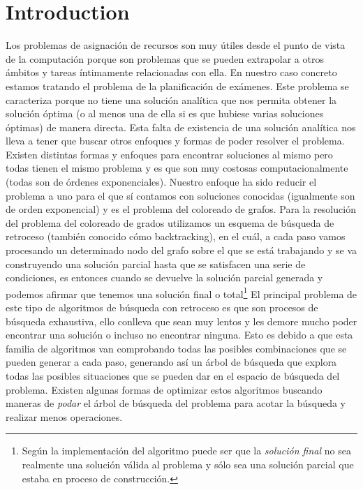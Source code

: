 \documentclass[british,a4paper,11pt,titlepage]{article}
\begin{document}
    \section{Introduction}
    \label{sec:intro}
    Los problemas de asignación de recursos son muy útiles desde el punto de vista de la computación porque son problemas que se pueden extrapolar a otros ámbitos y tareas íntimamente relacionadas con ella. En nuestro caso concreto estamos tratando el problema de la planificación de exámenes. Este problema se caracteriza porque no tiene una solución analítica que nos permita obtener la solución óptima (o al menos una de ella si es que hubiese varias soluciones óptimas) de manera directa.
    \newline
    Esta falta de existencia de una solución analítica nos lleva a tener que buscar otros enfoques y formas de poder resolver el problema. Existen distintas formas y enfoques para encontrar soluciones al mismo pero todas tienen el mismo problema y es que son muy costosas computacionalmente (todas son de órdenes exponenciales).
    \newline
    Nuestro enfoque ha sido reducir el problema a uno para el que sí contamos con soluciones conocidas (igualmente son de orden exponencial) y es el problema del coloreado de grafos. Para la resolución del problema del coloreado de grados utilizamos un esquema de búsqueda de retroceso (también conocido cómo backtracking), en el cuál, a cada paso vamos procesando un determinado nodo del grafo sobre el que se está trabajando y se va construyendo una solución parcial hasta que se satisfacen una serie de condiciones, es entonces cuando se devuelve la solución parcial generada y podemos afirmar que tenemos una solución final o total\footnote{\label{foot:intro}Según la implementación del algoritmo puede ser que la \emph{solución final} no sea realmente una solución válida al problema y sólo sea una solución parcial que estaba en proceso de construcción.}
    \newline
    El principal problema de este tipo de algoritmos de búsqueda con retroceso es que son procesos de búsqueda exhaustiva, ello conlleva que sean muy lentos y les demore mucho poder encontrar una solución o incluso no encontrar ninguna. Esto es debido a que esta familia de algoritmos van comprobando todas las posibles combinaciones que se pueden generar a cada paso, generando así un árbol de búsqueda que explora todas las posibles situaciones que se pueden dar en el espacio de búsqueda del problema.
    \newline
    Existen algunas formas de optimizar estos algoritmos buscando maneras de \emph{podar} el árbol de búsqueda del problema para acotar la búsqueda y realizar menos operaciones.
    \cleardoublepage
\end{document}
